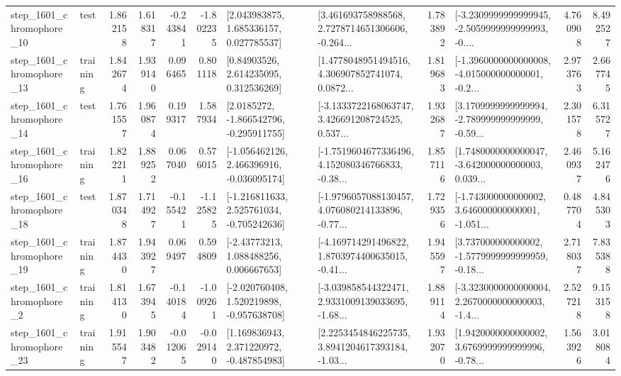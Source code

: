 \begin{tabular}{llrrrrllrlrr}
 step\_1601\_chromophore\_10 &      test &      1.862158 &    1.618317 &     -0.243841 & -1.802235 &     [2.043983875, 1.685336157, 0.027785537] &  [3.461693758988568, 2.7278714651306606, -0.264... &       1.783892 &  [-3.2309999999999945, -2.5059999999999993, -0.... &            4.760908 &          8.492527 \\
 step\_1601\_chromophore\_13 &  training &      1.842674 &    1.939140 &      0.096465 &  0.801118 &      [0.84903526, 2.614235095, 0.312536269] &  [1.4778048951494516, 4.306907852741074, 0.0872... &       1.819683 &  [-1.3960000000000008, -4.015000000000001, -0.2... &            2.973763 &          2.667745 \\
 step\_1601\_chromophore\_14 &      test &      1.761557 &    1.960874 &      0.199317 &  1.587934 &     [2.0185272, -1.866542796, -0.295911755] &  [-3.1333722168063747, 3.426691208724525, 0.537... &       1.932687 &  [3.1709999999999994, -2.789999999999999, -0.59... &            2.301578 &          6.315727 \\
 step\_1601\_chromophore\_16 &  training &      1.822211 &    1.889252 &      0.067040 &  0.576015 &   [-1.056462126, 2.466396916, -0.036095174] &  [-1.7519604677336496, 4.152080346766833, -0.38... &       1.857116 &  [1.7480000000000047, -3.642000000000003, 0.039... &            2.460937 &          5.162476 \\
 step\_1601\_chromophore\_18 &      test &      1.870348 &    1.714927 &     -0.155421 & -1.125825 &   [-1.216811633, 2.525761034, -0.705242636] &  [-1.9796057088130457, 4.076080214133896, -0.77... &       1.729356 &  [-1.743000000000002, 3.646000000000001, -1.051... &            0.487704 &          4.845303 \\
 step\_1601\_chromophore\_19 &  training &      1.874430 &    1.943927 &      0.069497 &  0.594809 &     [-2.43773213, 1.088488256, 0.006667653] &  [-4.169714291496822, 1.8703974400635015, -0.41... &       1.945597 &  [3.737000000000002, -1.5779999999999959, -0.18... &            2.718037 &          7.835388 \\
  step\_1601\_chromophore\_2 &  training &      1.814130 &    1.673945 &     -0.140184 & -1.009261 &   [-2.020760408, 1.520219898, -0.957638708] &  [-3.039858544322471, 2.9331009139033695, -1.68... &       1.889114 &  [-3.3230000000000004, 2.2670000000000003, -1.4... &            2.527218 &          9.153158 \\
 step\_1601\_chromophore\_23 &  training &      1.915547 &    1.903482 &     -0.012065 & -0.029140 &    [1.169836943, 2.371220972, -0.487854983] &  [2.2253454846225735, 3.8941204617393184, -1.03... &       1.932070 &  [1.9420000000000002, 3.6769999999999996, -0.78... &            1.563926 &          3.018084 \\

\end{tabular}
